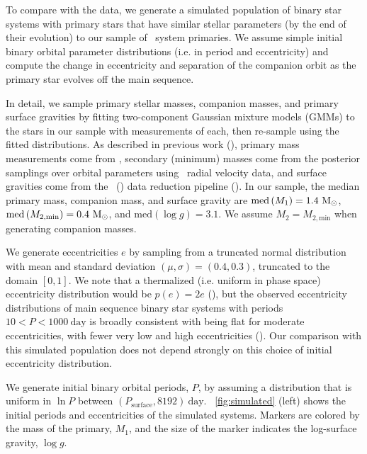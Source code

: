\documentclass[modern, letterpaper]{aastex62}
\newcommand{\apogee}{\project{\acronym{APOGEE}}}
\newcommand{\DR}{\acronym{DR14}}
\newcommand{\logg}{\ensuremath{\log g}}
\newcommand{\med}[1]{\ensuremath{\textrm{med}\left(#1\right)}}
\newcommand{\Psurf}{\ensuremath{P_\textrm{surface}}}
\begin{document}

To compare with the data, we generate a simulated population of binary star
systems with primary stars that have similar stellar parameters (by the end of
their evolution) to our sample of \apogee\ system primaries.
We assume simple initial binary orbital parameter distributions (i.e. in period
and eccentricity) and compute the change in eccentricity and separation of the
companion orbit as the primary star evolves off the main sequence.

In detail, we sample primary stellar masses, companion masses, and primary
surface gravities by fitting two-component Gaussian mixture models (GMMs) to the
stars in our sample with measurements of each, then re-sample using the fitted
distributions.
As described in previous work (\citealt{Price-Whelan:2018}), primary mass
measurements come from \cite{Ness:2016}, secondary (minimum) masses come from
the posterior samplings over orbital parameters using \apogee\ radial velocity
data, and surface gravities come from the \apogee\ (\DR) data reduction pipeline
(\citealt{Garcia-Perez:2016}).
In our sample, the median primary mass, companion mass, and surface gravity are
$\med{M_1} = 1.4~\msun$, $\med{M_{2, \textrm{min}}} = 0.4~\msun$, and
$\med{\logg} = 3.1$.
We assume $M_2 = M_{2, \textrm{min}}$ when generating companion masses.

We generate eccentricities $e$ by sampling from a truncated normal distribution
with mean and standard deviation $(\mu, \sigma) = (0.4, 0.3)$, truncated to the
domain $[0, 1]$.
We note that a thermalized (i.e. uniform in phase space) eccentricity distribution would be $p(e) = 2e$ (\citealt{Jeans:1919}), but the observed eccentricity distributions of main sequence binary star systems with periods $10 < P < 1000~\textrm{day}$ is broadly consistent with being flat for moderate eccentricities, with fewer very low and high eccentricities (\citealt{Duchene:2013}).
Our comparison with this simulated population does not depend strongly on this
choice of initial eccentricity distribution.

We generate initial binary orbital periods, $P$, by assuming a distribution that
is uniform in $\ln P$ between $(\Psurf, 8192)~\textrm{day}$.
\figurename~\ref{fig:simulated} (left) shows the initial periods and
eccentricities of the simulated systems.
Markers are colored by the mass of the primary, $M_1$, and the size of the
marker indicates the log-surface gravity, \logg.
\end{document}
